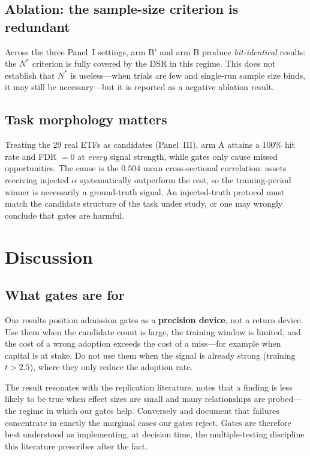 \documentclass[11pt]{article}
\begin{document}
\subsection{Ablation: the sample-size criterion is redundant}
\label{sec:ablation}

Across the three Panel~I settings, arm B$'$ and arm B produce \emph{bit-identical} results: the
$N^{*}$ criterion is fully covered by the DSR in this regime. This does not establish that
$N^{*}$ is useless---when trials are few and single-run sample size binds, it may still be
necessary---but it is reported as a negative ablation result.

\subsection{Task morphology matters}
\label{sec:morphology}

Treating the 29 real ETFs as candidates (Panel~III), arm A attains a $100\%$ hit rate and FDR
$=0$ at \emph{every} signal strength, while gates only cause missed opportunities. The cause is
the $0.504$ mean cross-sectional correlation: assets receiving injected $\alpha$ systematically
outperform the rest, so the training-period winner is necessarily a ground-truth signal. An
injected-truth protocol must match the candidate structure of the task under study, or one may
wrongly conclude that gates are harmful.

\section{Discussion}
\label{sec:discussion}

\subsection{What gates are for}

Our results position admission gates as a \textbf{precision device}, not a return device. Use
them when the candidate count is large, the training window is limited, and the cost of a wrong
adoption exceeds the cost of a miss---for example when capital is at stake. Do not use them when
the signal is already strong (training $t>2.5$), where they only reduce the adoption rate.

The result resonates with the replication literature. \citet{ioannidis} notes that a finding is
less likely to be true when effect sizes are small and many relationships are probed---the regime
in which our gates help. Conversely \citet{harveyliuzhu} and \citet{houxuezhang} document that
failures concentrate in exactly the marginal cases our gates reject. Gates are therefore best
understood as implementing, at decision time, the multiple-testing discipline this literature
prescribes after the fact.
\end{document}
